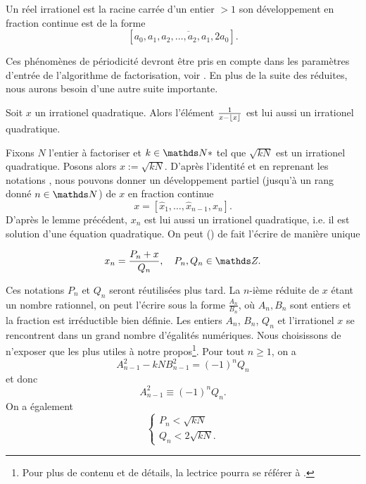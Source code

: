 \begin{theoreme}[Legendre, 1798]
	Un réel irrationel est la racine carrée d'un entier $>1$ \ssi son
	développement en fraction continue est de la forme \[[a_0, \overline{a_1,
	a_2, \dots, a_2, a_1, 2a_0}].\]
\end{theoreme}

Ces phénomènes de périodicité devront être pris en compte dans les paramètres
d'entrée de l'algorithme de factorisation, voir . En plus de la suite
des réduites, nous aurons besoin d'une autre suite importante.

\begin{lemme}
	Soit $x$ un irrationel quadratique. Alors l'élément $\frac{1}{x - \lfloor x\rfloor}$
	est lui aussi un irrationel quadratique. 
\end{lemme}

Fixons $N$ l'entier à factoriser et $k\in \N*$ tel que $\sqrt{kN}$ est un
irrationel quadratique. Posons alors $x := \sqrt{kN}$. D'après l'identité
\label{egalite-reduite} et en reprenant les notations \label{notations}, nous
pouvons donner un développement partiel (jusqu'à un rang donné $n\in
\N$) de $x$ en fraction continue \[x = [\hat{x}_1, \dots, \hat{x}_{n-1},
x_n].\] D'après le lemme précédent, $x_n$ est lui aussi un irrationel
quadratique, i.e. il est solution d'une équation quadratique. On peut
() de fait l'écrire de manière unique 

\begin{equation}
	x_n = \frac{P_n + x}{Q_n}, \quad P_n, Q_n \in \Z.
\end{equation}

Ces notations $P_n$ et $Q_n$ seront réutilisées plus tard. La $n$-ième réduite
de $x$ étant un nombre rationnel, on peut l'écrire sous la forme
$\frac{A_n}{B_n}$, où $A_n, B_n$ sont entiers et la fraction est irréductible
bien définie. Les entiers $A_n$, $B_n$, $Q_n$ et l'irrationel $x$ se
rencontrent dans un grand nombre d'égalités numériques. Nous choisissons de
n'exposer que les plus utiles à notre propos\footnote{Pour plus de contenu et
de détails, la lectrice pourra se référer à .}. Pour tout $n\geqslant
1$, on a \[A_{n-1}^2 - kN B_{n-1}^2 = (-1)^n Q_n\] et donc
\begin{equation}
	A_{n-1}^2 \equiv (-1)^n Q_n.
\end{equation}
On a également
\begin{equation}
	\begin{cases}
		P_n < \sqrt{kN} \\
		Q_n < 2\sqrt{kN}.
	\end{cases}
\end{equation}
